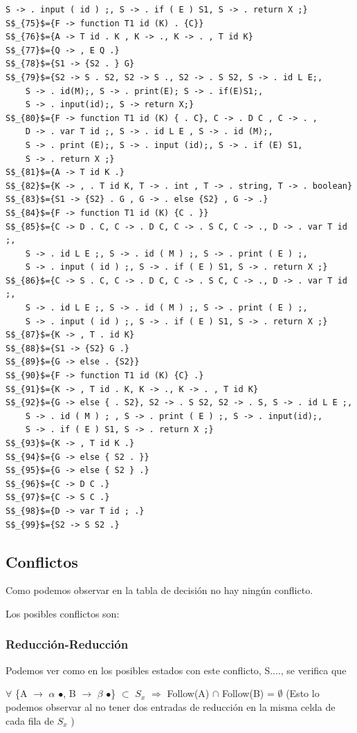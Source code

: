 \documentclass[a4paper, 12pt]{article}
\begin{document}
\begin{lstlisting}[basicstyle=\footnotesize]
	S -> . input ( id ) ;, S -> . if ( E ) S1, S -> . return X ;}
S$_{75}$={F -> function T1 id (K) . {C}}
S$_{76}$={A -> T id . K , K -> ., K -> . , T id K}
S$_{77}$={Q -> , E Q .}
S$_{78}$={S1 -> {S2 . } G}
S$_{79}$={S2 -> S . S2, S2 -> S ., S2 -> . S S2, S -> . id L E;,
	S -> . id(M);, S -> . print(E); S -> . if(E)S1;,
	S -> . input(id);, S -> return X;}
S$_{80}$={F -> function T1 id (K) { . C}, C -> . D C , C -> . ,
	D -> . var T id ;, S -> . id L E , S -> . id (M);,
	S -> . print (E);, S -> . input (id);, S -> . if (E) S1,
	S -> . return X ;}
S$_{81}$={A -> T id K .}
S$_{82}$={K -> , . T id K, T -> . int , T -> . string, T -> . boolean}
S$_{83}$={S1 -> {S2} . G , G -> . else {S2} , G -> .}
S$_{84}$={F -> function T1 id (K) {C . }}
S$_{85}$={C -> D . C, C -> . D C, C -> . S C, C -> ., D -> . var T id ;,
	S -> . id L E ;, S -> . id ( M ) ;, S -> . print ( E ) ;,
	S -> . input ( id ) ;, S -> . if ( E ) S1, S -> . return X ;}
S$_{86}$={C -> S . C, C -> . D C, C -> . S C, C -> ., D -> . var T id ;,
	S -> . id L E ;, S -> . id ( M ) ;, S -> . print ( E ) ;,
	S -> . input ( id ) ;, S -> . if ( E ) S1, S -> . return X ;}
S$_{87}$={K -> , T . id K}
S$_{88}$={S1 -> {S2} G .}
S$_{89}$={G -> else . {S2}}
S$_{90}$={F -> function T1 id (K) {C} .}
S$_{91}$={K -> , T id . K, K -> ., K -> . , T id K}
S$_{92}$={G -> else { . S2}, S2 -> . S S2, S2 -> . S, S -> . id L E ;,
	S -> . id ( M ) ; , S -> . print ( E ) ;, S -> . input(id);,
	S -> . if ( E ) S1, S -> . return X ;}
S$_{93}$={K -> , T id K .}  
S$_{94}$={G -> else { S2 . }}
S$_{95}$={G -> else { S2 } .}
S$_{96}$={C -> D C .}
S$_{97}$={C -> S C .}
S$_{98}$={D -> var T id ; .}
S$_{99}$={S2 -> S S2 .}
\end{lstlisting}

\subsection{Conflictos}
Como podemos observar en la tabla de decisión no hay ningún conflicto.

Los posibles conflictos son:
	\subsubsection*{Reducción-Reducción}
	Podemos ver como en los posibles estados con este conflicto, S...., se verifica que 
	
	$\forall$ \{A $\rightarrow$ $\alpha$ $\bullet$, B $\rightarrow$ $\beta$ $\bullet$\} $\subset$ $S_x$ $\Rightarrow$ Follow(A) $\cap$ Follow(B) = $\emptyset$ (Esto lo podemos observar al no tener dos entradas de reducción en la misma celda de cada fila de $S_x$ )
	
\end{document}
